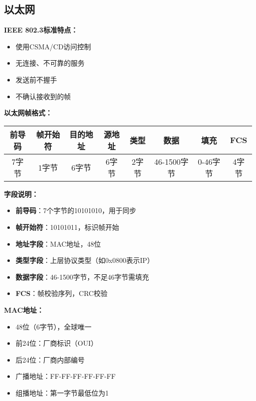 \documentclass[lang=cn,newtx,10pt,scheme=chinese]{../../elegantbook}
\begin{document}
\subsection{以太网}

\textbf{IEEE 802.3标准特点：}
\begin{itemize}
  \item 使用CSMA/CD访问控制
  \item 无连接、不可靠的服务
  \item 发送前不握手
  \item 不确认接收到的帧
\end{itemize}

\textbf{以太网帧格式：}
\begin{center}
\begin{tabular}{|c|c|c|c|c|c|c|c|}
\hline
前导码 & 帧开始符 & 目的地址 & 源地址 & 类型 & 数据 & 填充 & FCS \\
\hline
7字节 & 1字节 & 6字节 & 6字节 & 2字节 & 46-1500字节 & 0-46字节 & 4字节 \\
\hline
\end{tabular}
\end{center}

\textbf{字段说明：}
\begin{itemize}
  \item \textbf{前导码}：7个字节的10101010，用于同步
  \item \textbf{帧开始符}：10101011，标识帧开始
  \item \textbf{地址字段}：MAC地址，48位
  \item \textbf{类型字段}：上层协议类型（如0x0800表示IP）
  \item \textbf{数据字段}：46-1500字节，不足46字节需填充
  \item \textbf{FCS}：帧校验序列，CRC校验
\end{itemize}

\textbf{MAC地址：}
\begin{itemize}
  \item 48位（6字节），全球唯一
  \item 前24位：厂商标识（OUI）
  \item 后24位：厂商内部编号
  \item 广播地址：FF-FF-FF-FF-FF-FF
  \item 组播地址：第一字节最低位为1
\end{itemize}
\end{document}
